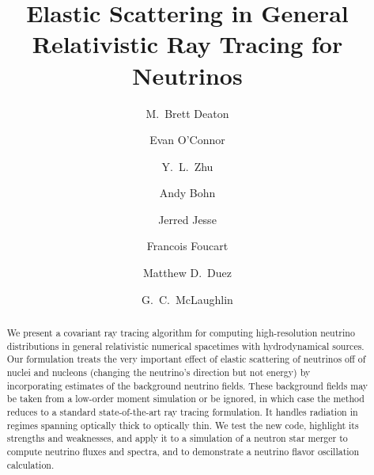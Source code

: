\documentclass[aps,floatfix,prd,superscriptaddress,twocolumn]{revtex4-1}
\begin{document}
\widetext
{}

\title{Elastic Scattering in General Relativistic Ray Tracing for Neutrinos}

\author{M.\ Brett Deaton}

\author{Evan O'Connor}

\author{Y.\ L.\ Zhu}

\author{Andy Bohn}

\author{Jerred Jesse}

\author{Francois Foucart}

\author{Matthew D.\ Duez}

\author{G.\ C.\ McLaughlin}


\begin{abstract}
  We present a covariant ray tracing algorithm for computing high-resolution
  neutrino distributions in general relativistic numerical spacetimes with
  hydrodynamical sources.
  Our formulation treats the very important effect of
  elastic scattering of neutrinos off of nuclei and nucleons
  (changing the neutrino's direction but not energy)
  by incorporating estimates of the background neutrino fields.
  These background fields may be taken from a low-order moment simulation
  or be ignored, in which case the method
  reduces to a standard state-of-the-art ray tracing formulation.
  It handles radiation in regimes spanning optically thick to optically thin.
  We test the new code, highlight its strengths and weaknesses,
  and apply it to a simulation of a neutron star merger
  to compute neutrino fluxes and spectra,
  and to demonstrate a neutrino flavor oscillation calculation.
\end{abstract}
\end{document}
